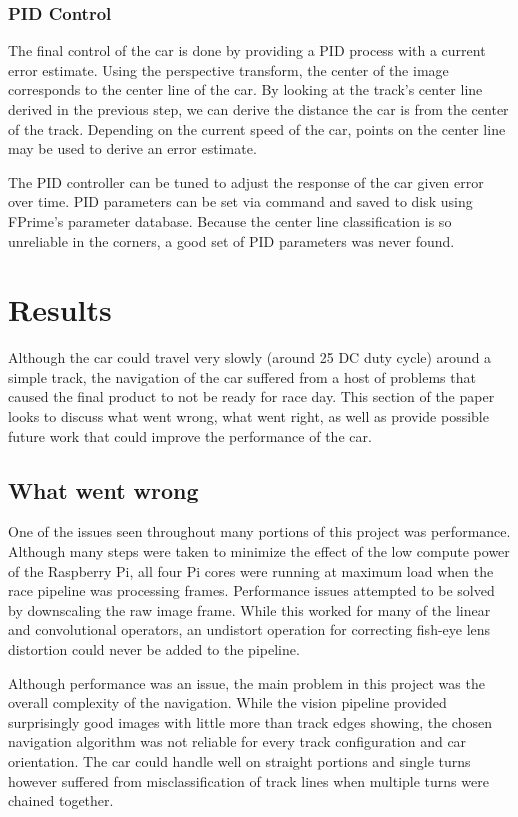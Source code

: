 \documentclass{article}
\begin{document}

\subsubsection{PID Control}

The final control of the car is done by providing a PID process with a current error estimate. Using the perspective transform, the center of the image corresponds to the center line of the car. By looking at the track's center line derived in the previous step, we can derive the distance the car is from the center of the track. Depending on the current speed of the car, points on the center line may be used to derive an error estimate.

The PID controller can be tuned to adjust the response of the car given error over time. PID parameters can be set via command and saved to disk using FPrime's parameter database. Because the center line classification is so unreliable in the corners, a good set of PID parameters was never found.

\section{Results}

Although the car could travel very slowly (around 25 DC duty cycle) around a simple track, the navigation of the car suffered from a host of problems that caused the final product to not be ready for race day. This section of the paper looks to discuss what went wrong, what went right, as well as provide possible future work that could improve the performance of the car.

\subsection{What went wrong}

One of the issues seen throughout many portions of this project was performance. Although many steps were taken to minimize the effect of the low compute power of the Raspberry Pi, all four Pi cores were running at maximum load when the race pipeline was processing frames. Performance issues attempted to be solved by downscaling the raw image frame. While this worked for many of the linear and convolutional operators, an undistort operation for correcting fish-eye lens distortion could never be added to the pipeline.

Although performance was an issue, the main problem in this project was the overall complexity of the navigation. While the vision pipeline provided surprisingly good images with little more than track edges showing, the chosen navigation algorithm was not reliable for every track configuration and car orientation. The car could handle well on straight portions and single turns however suffered from misclassification of track lines when multiple turns were chained together.
\end{document}
